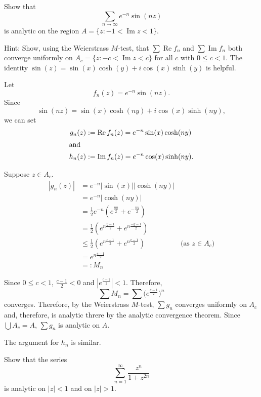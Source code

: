 \documentclass[12pt, answers]{exam}
\renewcommand{\Re}{\operatorname{Re}}
\renewcommand{\Im}{\operatorname{Im}}
\begin{document}
\begin{questions}
    \question
    Show that
    $$\sum_{n\to\infty}e^{-n}\sin(nz)$$
    is analytic on the region $A=\{z: -1 <\Im z < 1\}$.
    
    Hint: Show, using the Weierstrass $M$-test, that $\sum \Re f_n$ and $\sum \Im f_n$ both converge uniformly on $A_c=\{z : -c < \Im z < c\}$
    for all $c$ with $0\leq c<1$. The identity $\sin (z) = \sin(x)\cosh(y) + i\cos(x)\sinh(y)$ is helpful.

    \begin{solution}
        Let
        $$
        f_n(z) = e^{-n}\sin(nz).
        $$
        Since
        $$
        \sin (nz) = \sin(x)\cosh(ny) + i\cos(x)\sinh(ny),
        $$
        we can set
        \begin{align*}
        g_n(z) &:= \Re f_n(z) = e^{-n}\sin(x)\cosh(ny)\\
        \intertext{and}
        h_n(z) &:= \Im f_n(z) = e^{-n}\cos(x)\sinh(ny).
        \end{align*}
        
        Suppose $z\in A_c$.
        \begin{align*}
            |g_n(z)| &= e^{-n}|\sin(x)||\cosh(ny)|\\
            &= e^{-n}|\cosh(ny)|\\
            &= \frac12 e^{-n}(e^{\frac{ny}2} + e^{-\frac{ny}2})\\
            &= \frac12 (e^{n\frac{y-1}2} + e^{n\frac{-y-1}2})\\
            &\leq \frac12(e^{n\frac{c-1}2} + e^{n\frac{c-1}2})&\text{(as $z\in A_c$)}\\
            &=e^{n\frac{c-1}2}\\
            &=: M_n
        \end{align*}

        Since $0\leq c<1$, $\frac{c-1}2<0$ and $|e^{\frac{c-1}2}|< 1$.
        Therefore,
        $$
        \sum M_n = \sum \big(e^{\frac{c-1}2}\big)^n
        $$
        converges.
        Therefore, by the Weierstrass $M$-test, $\sum g_n$ converges uniformly on $A_c$ and,
        therefore, is analytic threre by the analytic convergence theorem.
        Since $\bigcup A_c = A$, $\sum g_n$ is analytic on $A$.

        The argument for $h_n$ is similar.
    \end{solution}

    \question
    Show that the series
    $$
    \sum_{n=1}^\infty \frac{z^n}{1+z^{2n}}
    $$
    is analytic on $|z|<1$ and on $|z|>1$.


\end{questions}
\end{document}
